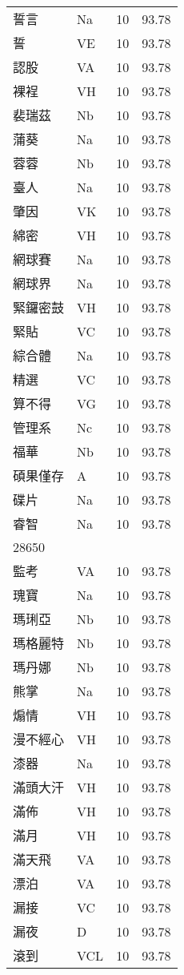 \documentclass[twocolumn]{book}
\begin{document}
\begin{supertabular}{llrr}
誓言 & Na & 10 &  93.78\\
誓 & VE & 10 &  93.78\\
認股 & VA & 10 &  93.78\\
裸裎 & VH & 10 &  93.78\\
裴瑞茲 & Nb & 10 &  93.78\\
蒲葵 & Na & 10 &  93.78\\
蓉蓉 & Nb & 10 &  93.78\\
臺人 & Na & 10 &  93.78\\
肇因 & VK & 10 &  93.78\\
綿密 & VH & 10 &  93.78\\
網球賽 & Na & 10 &  93.78\\
網球界 & Na & 10 &  93.78\\
緊鑼密鼓 & VH & 10 &  93.78\\
緊貼 & VC & 10 &  93.78\\
綜合體 & Na & 10 &  93.78\\
精選 & VC & 10 &  93.78\\
算不得 & VG & 10 &  93.78\\
管理系 & Nc & 10 &  93.78\\
福華 & Nb & 10 &  93.78\\
碩果僅存 & A & 10 &  93.78\\
碟片 & Na & 10 &  93.78\\
睿智 & Na & 10 &  93.78\\
28650\\
監考 & VA & 10 &  93.78\\
瑰寶 & Na & 10 &  93.78\\
瑪琍亞 & Nb & 10 &  93.78\\
瑪格麗特 & Nb & 10 &  93.78\\
瑪丹娜 & Nb & 10 &  93.78\\
熊掌 & Na & 10 &  93.78\\
煽情 & VH & 10 &  93.78\\
漫不經心 & VH & 10 &  93.78\\
漆器 & Na & 10 &  93.78\\
滿頭大汗 & VH & 10 &  93.78\\
滿佈 & VH & 10 &  93.78\\
滿月 & VH & 10 &  93.78\\
滿天飛 & VA & 10 &  93.78\\
漂泊 & VA & 10 &  93.78\\
漏接 & VC & 10 &  93.78\\
漏夜 & D & 10 &  93.78\\
滾到 & VCL & 10 &  93.78\\

\end{supertabular}
\end{document}

